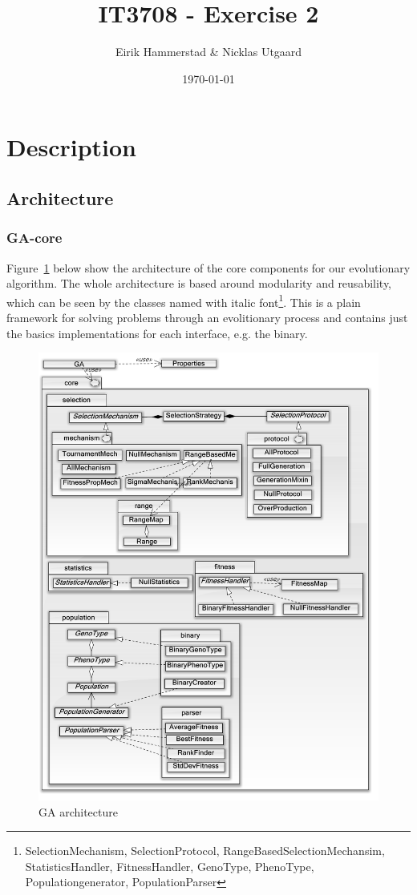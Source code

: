 \documentclass[12pt]{article}
\title{IT3708 - Exercise 2}
\author{
        Eirik Hammerstad \& Nicklas Utgaard
}
\date{\today}
\begin{document}
\maketitle
\pagebreak
\tableofcontents
\pagebreak
\section{Description}
	\subsection{Architecture}
		\subsubsection{GA-core}
			Figure~\ref{fig:gastruct} below show the architecture of the core components for our evolutionary algorithm. The whole architecture is based around modularity and reusability, which can be seen by the classes named with italic font\footnote{SelectionMechanism, SelectionProtocol, RangeBasedSelectionMechansim, StatisticsHandler, FitnessHandler, GenoType, PhenoType, Populationgenerator, PopulationParser}. This is a plain framework for solving problems through an evolitionary process and contains just the basics implementations for each interface, e.g. the binary.
			\begin{figure}[H]
				\centerline{\includegraphics[width=.7\columnwidth]{./../images/GAStruct.png}}
				\caption{GA architecture}%
				\label{fig:gastruct}%
			\end{figure}
\end{document}
